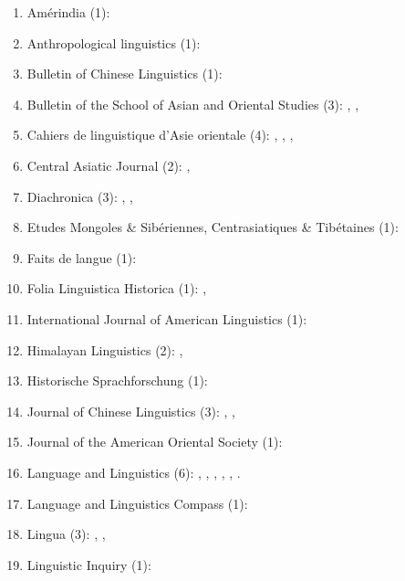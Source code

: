 \documentclass[oldfontcommands,oneside,a4paper,11pt]{article}
\begin{document}
 \begin{enumerate}
 \item Amérindia (1): \citet{jacques12bear}
 \item Anthropological linguistics (1): \citet{japhug14ideophones}
 \item Bulletin of Chinese Linguistics (1): \citet{jacques15derivational.khaling}
 \item Bulletin of the School of Asian and Oriental Studies (3):  \citet{jacques10refl}, \citet{rg-gj12yod}, \citet{jacques13yod}
 \item Cahiers de linguistique d'Asie orientale (4): \citet{jacques00ywij},  \citet{jacques03dissimilation},   \citet{jacques07chang},  \citet{michaud10bonin}
 \item Central Asiatic Journal (2):  \citet{jacques10imperial}, \citet{jacques14ergative}
  \item Diachronica (3): \citet{jacques.michaud11naish}, \citet{michaud-jacques12nasalite}, \citet{jacques15comparative}
  \item Etudes Mongoles \& Sibériennes, Centrasiatiques \& Tibétaines (1):  \citet{jacques09e}
  \item Faits de langue (1): \citet{jacques07redupl}
 \item Folia Linguistica Historica (1): \citet{jacques13arapaho}, \citet{jacques15causative}
 \item International Journal of American Linguistics (1): \citet{jacques16ebde}
 \item Himalayan Linguistics (2): \citet{jacques10zos},  \citet{jacques14rtau}
 \item Historische Sprachforschung (1): \citet{jacques15cochon}
 \item Journal of Chinese Linguistics (3):   \citet{jacques11tangut.verb}, \citet{jacques15sr}, \citet{jacques16relatives}
 \item Journal of the American Oriental Society (1): \citet{jacques11ngwemi}
   \item Language and Linguistics (6):  \citet{jacques07passif}, \citet{jacques09tangutverb}, \citet{jacques10inverse},     \citet{jacques11pumi.tone}, \citet{jacques12agreement},    \citet{jacques12khaling}.  
   \item  Language and Linguistics Compass (1): \citet{jacques14inverse}   
 \item Lingua (3):  \citet{jacques11lingua}, \citet{jacques12incorp}, \citet{jacques14antipassive}
 \item Linguistic Inquiry (1): \citet{antonov14need}

\end{enumerate}
\end{document}
